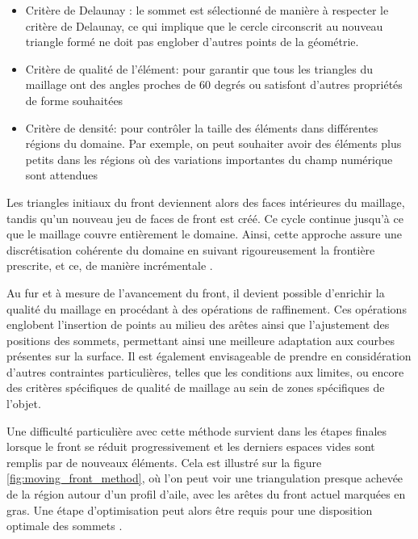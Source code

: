 \begin{itemize}
    \item Critère de Delaunay : le sommet est sélectionné de manière à respecter le critère de Delaunay, ce qui implique que le cercle circonscrit au nouveau triangle formé ne doit pas englober d'autres points de la géométrie.\\
    \item Critère de qualité de l'élément: pour garantir que tous les triangles du maillage ont des angles proches de 60 degrés ou satisfont d'autres propriétés de forme souhaitées\\
    \item Critère de densité: pour contrôler la taille des éléments dans différentes régions du domaine. Par exemple, on peut souhaiter avoir des éléments plus petits dans les régions où des variations importantes du champ numérique sont attendues\\
\end{itemize}


Les triangles initiaux du front deviennent alors des faces intérieures du maillage, tandis qu'un nouveau jeu de faces de front est créé. Ce cycle continue jusqu'à ce que le maillage couvre entièrement le domaine. Ainsi, cette approche assure une discrétisation cohérente du domaine en suivant rigoureusement la frontière prescrite, et ce, de manière incrémentale \cite{baker2005mesh}.

Au fur et à mesure de l'avancement du front, il devient possible d'enrichir la qualité du maillage en procédant à des opérations de raffinement. Ces opérations englobent l'insertion de points au milieu des arêtes ainsi que l'ajustement des positions des sommets, permettant ainsi une meilleure adaptation aux courbes présentes sur la surface. Il est également envisageable de prendre en considération d'autres contraintes particulières, telles que les conditions aux limites, ou encore des critères spécifiques de qualité de maillage au sein de zones spécifiques de l'objet.

Une difficulté particulière avec cette méthode survient dans les étapes finales lorsque le front se réduit progressivement et les derniers espaces vides sont remplis par de nouveaux éléments. Cela est illustré sur la figure \ref{fig:moving_front_method}, où l'on peut voir une triangulation presque achevée de la région autour d'un profil d'aile, avec les arêtes du front actuel marquées en gras.  Une étape d'optimisation peut alors être requis pour une disposition optimale des sommets \cite{botella2016generation}.


